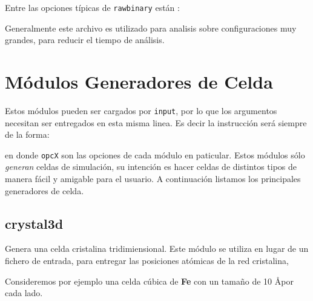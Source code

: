 Entre las opciones t\'ipicas de \verb|rawbinary| est\'an :


Generalmente este archivo es utilizado para analisis sobre configuraciones muy grandes, para reducir el tiempo de an\'alisis.

\section{M\'odulos Generadores de Celda}
\label{chap:modulos:generadores}
Estos m\'odulos pueden ser cargados por \verb|input|, por lo que los argumentos necesitan ser entregados en esta misma linea. Es decir la instrucci\'on ser\'a siempre de la forma:


en donde \verb|opcX| son las opciones de cada m\'odulo en paticular. Estos m\'odulos s\'olo \textit{generan} celdas de simulaci\'on, su intenci\'on es hacer celdas de distintos tipos de manera f\'acil y amigable para el usuario. A continuaci\'on listamos los principales generadores de celda.

\subsection{crystal3d}
Genera una celda cristalina tridimiensional. Este m\'odulo se utiliza en lugar de un fichero de entrada, para entregar las posiciones at\'omicas de la red cristalina, 


Consideremos por ejemplo una celda c\'ubica de \textbf{Fe} con un tama\~no de 10 \AA por cada lado.

